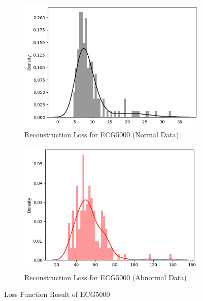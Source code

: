\documentclass[nonacm,sigconf]{acmart}
\begin{document}
\begin{figure}[ht]
    \begin{subfigure}[b]{0.2\textwidth}
        \centering
        \includegraphics[width=\textwidth]{ecg5000/reconstruction_loss_normal.png} %
        \caption{Reconstruction Loss for ECG5000 (Normal Data)}
        \label{fig:second_image}
    \end{subfigure}
    \hfill %
    \begin{subfigure}[b]{0.2\textwidth}
        \centering
        \includegraphics[width=\textwidth]{ecg5000/reconstruction_loss_abnormal.png} %
        \caption{Reconstruction Loss for ECG5000 (Abnormal Data)}
        \label{fig:third_image}
    \end{subfigure}

    \caption{Loss Function Result of ECG5000}
    \label{fig:overall_figure}
\end{figure}
\end{document}
